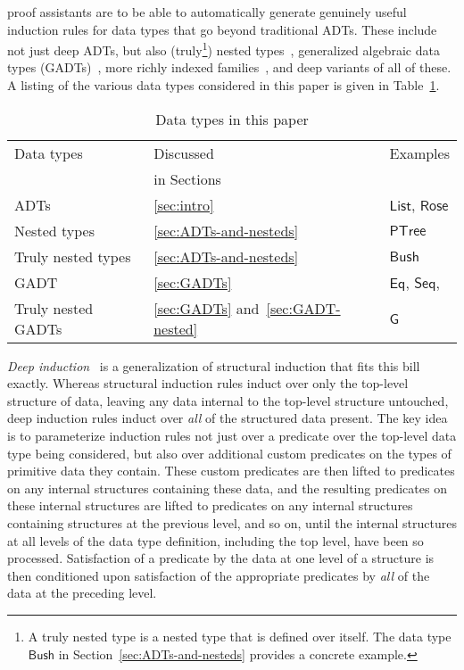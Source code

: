 \documentclass[sigplan,10pt]{acmart}
\begin{document}
proof assistants are to be
able to automatically generate genuinely useful induction rules for
data types that go
beyond traditional ADTs. These
include not just deep ADTs, but also (truly\footnote{A truly nested
  type is a nested type that is defined over itself. The data type
  $\mathsf{Bush}$ in Section~\ref{sec:ADTs-and-nesteds} provides a
  concrete example.}) nested types~\cite{bm98},
generalized algebraic data types
(GADTs)~\cite{ch03,pvww06,sp04,xcc03}, more richly indexed
families~\cite{dyb94}, and deep variants of all of these. A listing of
the various data types considered in this paper is given in
Table~\ref{fig:taxonomy}.

\begin{table}[h!]
\begin{tabular}{|l|l|l|}
\hline
Data types & Discussed & Examples \\
          & in Sections &          \\
\hline\hline
ADTs & \ref{sec:intro} &
$\mathsf{List}$, $\mathsf{Rose}$ \\ 
Nested types & \ref{sec:ADTs-and-nesteds} & $\mathsf{PTree}$ \\  
Truly nested types & \ref{sec:ADTs-and-nesteds} & $\mathsf{Bush}$\\
GADT & \ref{sec:GADTs} & $\mathsf{Eq}$, $\mathsf{Seq}$,\\
Truly nested GADTs & \ref{sec:GADTs} and~\ref{sec:GADT-nested}&
$\mathsf{G}$\\ 
\hline
\end{tabular}
\caption{Data types in this paper}\label{fig:taxonomy}
\end{table}

{\em Deep induction}~\cite{jp20} is a generalization of structural
induction that fits this bill exactly. Whereas structural induction
rules induct over only the top-level structure of data, leaving any
data internal to the top-level structure untouched, deep induction
rules induct over {\em all} of the structured data present. The key
idea is to parameterize induction rules not just over a predicate over
the top-level data type being considered, but also over additional
custom predicates on the types of primitive data they contain. These
custom predicates are then lifted to predicates on any internal
structures containing these data, and the resulting predicates on
these internal structures are lifted to predicates on any internal
structures containing structures at the previous level, and so on,
until the internal structures at all levels of the data type
definition, including the top level, have been so
processed. Satisfaction of a predicate by the data at one level of a
structure is then conditioned upon satisfaction of the appropriate
predicates by {\em all} of the data at the preceding level.
\end{document}
